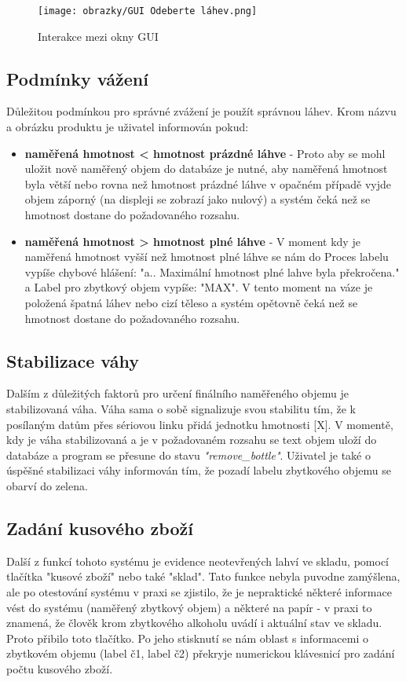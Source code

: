 \begin{figure}[H]
    \begin{center}
        \texttt{[image: obrazky/GUI Odeberte láhev.png]}
    \end{center}
    \caption{Interakce mezi okny GUI}
    \label{Interakce mezi okny GUI}
\end{figure}

\subsection{Podmínky vážení}
Důležitou podmínkou pro správné zvážení je použít správnou láhev. Krom názvu a obrázku produktu je uživatel informován pokud:
\begin{itemize}
    \item \textbf{naměřená hmotnost < hmotnost prázdné láhve} - Proto aby se mohl uložit nově naměřený objem do databáze je nutné, aby naměřená hmotnost byla větší nebo rovna než hmotnost prázdné láhve v opačném případě vyjde objem záporný (na displeji se zobrazí jako nulový) a systém čeká než se hmotnost dostane do požadovaného rozsahu.
    \item \textbf{naměřená hmotnost > hmotnost plné láhve} - V moment kdy je naměřená hmotnost vyšší než hmotnost plné láhve se nám do Proces labelu vypíše chybové hlášení: "a.. Maximální hmotnost plné lahve byla překročena." a Label pro zbytkový objem vypíše: "MAX". V tento moment na váze je položená špatná láhev nebo cizí těleso a systém opětovně čeká než se hmotnost dostane do požadovaného rozsahu.
\end{itemize}

\subsection{Stabilizace váhy}
Dalším z důležitých faktorů pro určení finálního naměřeného objemu je stabilizovaná váha. Váha sama o sobě signalizuje svou stabilitu tím, že k posílaným datům přes sériovou linku přidá jednotku hmotnosti [X]. V momentě, kdy je váha stabilizovaná a je v požadovaném rozsahu se text objem uloží do databáze a program se přesune do stavu \textit{"remove\_bottle"}. Uživatel je také o úspěšné stabilizaci váhy informován tím, že pozadí labelu zbytkového objemu se obarví do zelena. 

\subsection{Zadání kusového zboží}
Další z funkcí tohoto systému je evidence neotevřených lahví ve skladu, pomocí tlačítka "kusové zboží" nebo také "sklad". Tato funkce nebyla puvodne zamýšlena, ale po otestování systému v praxi se zjistilo, že je nepraktické některé informace vést do systému (naměřený zbytkový objem) a některé na papír - v praxi to znamená, že člověk krom zbytkového alkoholu uvádí i aktuální stav ve skladu. Proto přibilo toto tlačítko. Po jeho stisknutí se nám oblast s informacemi o zbytkovém objemu (label č1, label č2) překryje numerickou klávesnicí pro zadání počtu kusového zboží. %

